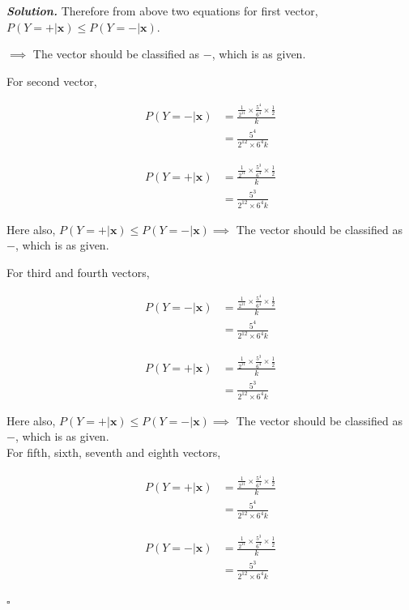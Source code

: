\documentclass[8pt]{article}
\newenvironment{solution}[1][\it{Solution}]{\textbf{#1. } }{$\square$}
\begin{document}
\begin{solution}
Therefore from above two equations for first vector, $P(Y = + | \boldsymbol{x}) \le P(Y = - | \boldsymbol{x})$.

$\implies$ The vector should be classified as $-$, which is as given.

For second vector,

$$
\begin{aligned}
P(Y = - | \boldsymbol{x}) &= \frac{\frac{1}{2^{11}}\times\frac{5^4}{6^4}\times\frac{1}{2}}{k}\\
&= \frac{5^4}{2^{12} \times 6^4k}
\end{aligned}
$$

$$
\begin{aligned}
P(Y = + | \boldsymbol{x}) &= \frac{\frac{1}{2^{11}}\times\frac{5^3}{6^4}\times\frac{1}{2}}{k}\\
&= \frac{5^3}{2^{12} \times 6^4k}
\end{aligned}
$$

Here also, $P(Y = + | \boldsymbol{x}) \le P(Y = - | \boldsymbol{x}) \implies$ The vector should be classified as $-$, which is as given.


For third and fourth vectors,

$$
\begin{aligned}
P(Y = - | \boldsymbol{x}) &= \frac{\frac{1}{2^{11}}\times\frac{5^4}{6^4}\times\frac{1}{2}}{k}\\
&= \frac{5^4}{2^{12} \times 6^4k}
\end{aligned}
$$

$$
\begin{aligned}
P(Y = + | \boldsymbol{x}) &= \frac{\frac{1}{2^{11}}\times\frac{5^3}{6^4}\times\frac{1}{2}}{k}\\
&= \frac{5^3}{2^{12} \times 6^4k}
\end{aligned}
$$

Here also, $P(Y = + | \boldsymbol{x}) \le P(Y = - | \boldsymbol{x}) \implies$ The vector should be classified as $-$, which is as given.\\


For fifth, sixth, seventh and eighth vectors,

$$
\begin{aligned}
P(Y = + | \boldsymbol{x}) &= \frac{\frac{1}{2^{11}}\times\frac{5^4}{6^4}\times\frac{1}{2}}{k}\\
&= \frac{5^4}{2^{12} \times 6^4k}
\end{aligned}
$$

$$
\begin{aligned}
P(Y = - | \boldsymbol{x}) &= \frac{\frac{1}{2^{11}}\times\frac{5^3}{6^4}\times\frac{1}{2}}{k}\\
&= \frac{5^3}{2^{12} \times 6^4k}
\end{aligned}
$$


\end{solution}
\end{document}
